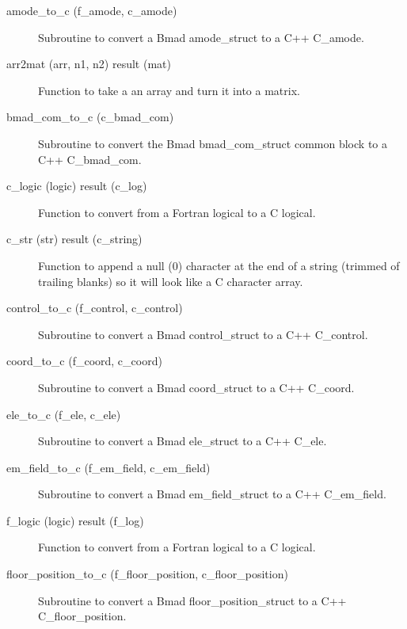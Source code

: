 \begin{description}

\item[amode_to_c (f_amode, c_amode)] \Newline 
Subroutine to convert a Bmad amode_struct to a C++ C_amode.

\item[arr2mat (arr, n1, n2) result (mat)] \Newline 
Function to take a an array and turn it into a matrix.

\item[bmad_com_to_c (c_bmad_com)] \Newline 
Subroutine to convert the Bmad bmad_com_struct common block to 
a C++ C_bmad_com.

\item[c_logic (logic) result (c_log)] \Newline 
Function to convert from a Fortran logical to a C logical.

\item[c_str (str) result (c_string)] \Newline 
Function to append a null (0) character at the end of a string (trimmed
of trailing blanks) so it will look like a C character array. 

\item[control_to_c (f_control, c_control)] \Newline 
Subroutine to convert a Bmad control_struct to a C++ C_control.

\item[coord_to_c (f_coord, c_coord)] \Newline 
Subroutine to convert a Bmad coord_struct to a C++ C_coord.

\item[ele_to_c (f_ele, c_ele)] \Newline 
Subroutine to convert a Bmad ele_struct to a C++ C_ele.

\item[em_field_to_c (f_em_field, c_em_field)] \Newline 
Subroutine to convert a Bmad em_field_struct to a C++ C_em_field.

\item[f_logic (logic) result (f_log)] \Newline 
Function to convert from a Fortran logical to a C logical.

\item[floor_position_to_c (f_floor_position, c_floor_position)] \Newline 
Subroutine to convert a Bmad floor_position_struct to a C++ C_floor_position.


\end{description}

